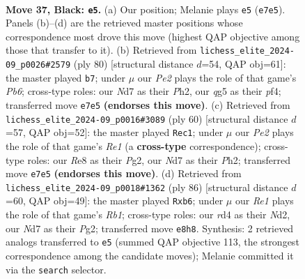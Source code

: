 \documentclass[11pt]{article}
\begin{document}
\clearpage

\begin{figure}[p]\centering
\begin{subfigure}{0.46\textwidth}\centering
\resizebox{\linewidth}{!}{%
\newchessgame
\chessboard[
  setfen={k3r3/1p1np3/1r1p4/6Q1/3RP3/1PR2P2/K3b1PP/8 b - - 4 37},
  showmover=false,
  pgfstyle=straightmove, color=movearrow, markmove={e7-e5}
]}
\caption{}
\end{subfigure}\hfill
\begin{subfigure}{0.46\textwidth}\centering
\resizebox{\linewidth}{!}{%
\newchessgame
\chessboard[
  setfen={2r5/R1P1r1k1/1P5p/3B1p2/4pp2/3p4/7P/2R3K1 w - - 0 41},
  showmover=false,
  pgfstyle=straightmove, color=movearrow, markmove={b6-b7}
]}
\caption{}
\end{subfigure}
\\[4pt]
\begin{subfigure}{0.46\textwidth}\centering
\resizebox{\linewidth}{!}{%
\newchessgame
\chessboard[
  setfen={6k1/6p1/2p1rp1p/1p6/r2P4/P1R1P3/5KPP/4R3 w - - 2 31},
  showmover=false,
  pgfstyle=straightmove, color=movearrow, markmove={e1-c1}
]}
\caption{}
\end{subfigure}\hfill
\begin{subfigure}{0.46\textwidth}\centering
\resizebox{\linewidth}{!}{%
\newchessgame
\chessboard[
  setfen={8/6k1/1p4p1/2r1np2/r1p5/P1R4P/3N2P1/1R4K1 w - - 0 44},
  showmover=false,
  pgfstyle=straightmove, color=movearrow, markmove={b1-b6}
]}
\caption{}
\end{subfigure}
\caption{\textbf{Move 37, Black: \texttt{e5}.} (a) Our position; Melanie plays \texttt{e5} (\texttt{e7e5}). Panels (b)--(d) are the retrieved master positions whose correspondence most drove this move (highest QAP objective among those that transfer to it). (b) Retrieved from \texttt{lichess\_elite\_2024-09\_p0026\#2579} (ply 80) [structural distance $d$=54, QAP obj=61]: the master played \texttt{b7}; under $\mu$ our \emph{Pe2} plays the role of that game's \emph{Pb6}; cross-type roles: our \emph{N}d7 as their \emph{P}h2, our \emph{q}g5 as their \emph{p}f4; transferred move \texttt{e7e5} \textbf{(endorses this move)}. (c) Retrieved from \texttt{lichess\_elite\_2024-09\_p0016\#3089} (ply 60) [structural distance $d$=57, QAP obj=52]: the master played \texttt{Rec1}; under $\mu$ our \emph{Pe2} plays the role of that game's \emph{Re1} (a \textbf{cross-type} correspondence); cross-type roles: our \emph{R}e8 as their \emph{P}g2, our \emph{N}d7 as their \emph{P}h2; transferred move \texttt{e7e5} \textbf{(endorses this move)}. (d) Retrieved from \texttt{lichess\_elite\_2024-09\_p0018\#1362} (ply 86) [structural distance $d$=60, QAP obj=49]: the master played \texttt{Rxb6}; under $\mu$ our \emph{Re1} plays the role of that game's \emph{Rb1}; cross-type roles: our \emph{r}d4 as their \emph{N}d2, our \emph{N}d7 as their \emph{P}g2; transferred move \texttt{e8h8}. Synthesis: 2 retrieved analogs transferred to \texttt{e5} (summed QAP objective 113, the strongest correspondence among the candidate moves); Melanie committed it via the \texttt{search} selector.}
\label{fig:thought-m73}
\end{figure}
\end{document}
